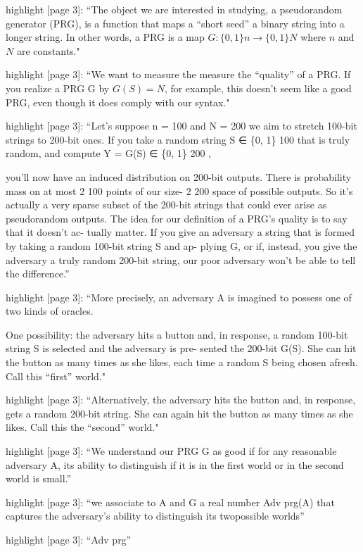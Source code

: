 highlight {[}page 3{]}: ``The object we are interested in studying, a
pseudorandom generator (PRG), is a function that maps a ``short
seed'' a binary string into a longer string. In other words, a PRG
is a map $G: \{0, 1\} n → \{0, 1\} N$ where $n$ and $N$ are constants."

highlight {[}page 3{]}: ``We want to measure the measure the ``quality''
of a PRG. If you realize a PRG G by $G(S) = N$, for example, this
doesn't seem like a good PRG, even though it does comply with our
syntax."

highlight {[}page 3{]}: ``Let's suppose n = 100 and N = 200
we aim to stretch 100-bit strings to 200-bit ones. If you take a random string
 S ∈ \{0, 1\} 100 that is truly random, and compute Y = G(S) ∈ \{0, 1\} 200 ,
 
you'll now have an induced distribution on 200-bit outputs. There is probability mass on at most 2 100 points of our size- 2 200 space of possible outputs. So it's actually a very sparse subset of the 200-bit
strings that could ever arise as pseudorandom outputs. The idea for our definition of a PRG's quality is to say that it doesn't ac- tually
matter. If you give an adversary a string that is formed by taking a
random 100-bit string S and ap- plying G, or if, instead, you give the adversary a truly random 200-bit string, our poor adversary won't be
able to tell the difference.''

highlight {[}page 3{]}: ``More precisely, an adversary A is imagined to
possess one of two kinds of oracles. 

One possibility: the adversary
hits a button and, in response, a random 100-bit string S is selected
and the adversary is pre- sented the 200-bit G(S). She can hit the
button as many times as she likes, each time a random S being chosen
afresh. Call this ``first'' world."

highlight {[}page 3{]}: ``Alternatively, the adversary hits the button and, in response, gets a random 200-bit string. She can again hit the button as many times as she likes. Call this the ``second'' world."

highlight {[}page 3{]}: ``We understand our PRG G as good if for any reasonable adversary A, its ability to distinguish if it is in the first world or in the second world is small.''

highlight {[}page 3{]}: ``we associate to A and G a real number Adv prg(A) that captures the adversary's ability to distinguish its twopossible worlds''

highlight {[}page 3{]}: ``Adv prg''

